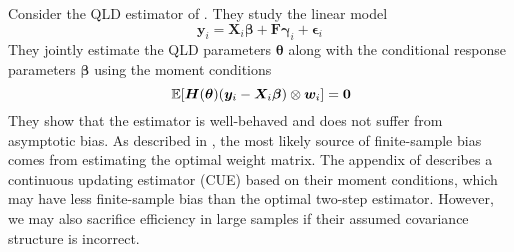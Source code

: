 Consider the QLD estimator of \citet{Ahn_Lee_Schmidt_2013}. They study the linear model
\begin{equation}
    \bm y_i = \bm X_i \bm \beta + \bm F \bm \gamma_i + \bm \epsilon_i
\end{equation}
They jointly estimate the QLD parameters $\bm \theta$ along with the conditional response parameters $\bm \beta$ using the moment conditions
\begin{equation}
    \expec{\bm H(\bm \theta) (\bm y_i - \bm X_i \bm \beta) \otimes \bm w_i} = \bm 0
\end{equation}
They show that the estimator is well-behaved and does not suffer from asymptotic bias. As described in \citet{windmeijer2005finite}, the most likely source of finite-sample bias comes from estimating the optimal weight matrix. The appendix of \citet{Ahn_Lee_Schmidt_2013} describes a continuous updating estimator (CUE) based on their moment conditions, which may have less finite-sample bias than the optimal two-step estimator. However, we may also sacrifice efficiency in large samples if their assumed covariance structure is incorrect. 

